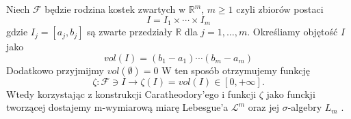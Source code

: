 \begin{defi}
	Niech $\mathcal{F}$ będzie rodzina kostek zwartych w $\mathbb{R}^m$, $m \geq 1$ czyli zbiorów postaci $$
		I = I_1 \times \cdots \times I_m
	$$gdzie $I_j=[a_j, b_j]$ są zwarte przedziały $\mathbb{R}$ dla $j = 1, \dots, m$. Określiamy objętość $I$ jako $$
		vol(I) = (b_1 - a_1) \cdots (b_m - a_m)
	$$
	Dodatkowo przyjmijmy $vol(\emptyset) = 0$\newline
	W ten sposób otrzymujemy funkcję $$
		\zeta: \mathcal{F} \ni I \rightarrow \zeta(I) = vol(I) \in [0, + \infty].
	$$
	Wtedy korzystając z konstrukcji Caratheodory'ego i funkcji $\zeta$ jako funckji tworzącej dostajemy m-wymiarową miarę Lebesgue'a $\mathcal{L}^m$ oraz jej $\sigma$-algebry $L_m$ .
\end{defi}